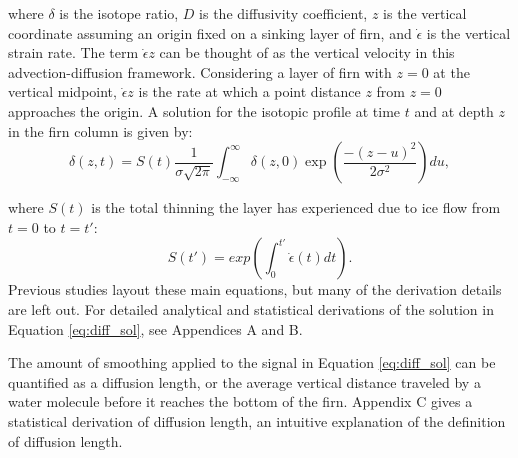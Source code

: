 \documentclass[draft, jgrga]{AGUTeX}
\begin{document}
\begin{article}
\noindent where \begin{math} \delta \end{math} is the isotope ratio, \begin{math} D \end{math} is the diffusivity coefficient, \begin{math} z \end{math} is the vertical coordinate assuming an origin fixed on a sinking layer of firn, and \begin{math} \dot{\epsilon} \end{math} is the vertical strain rate. The term \begin{math} \dot{\epsilon} z \end{math} can be thought of as the vertical velocity in this advection-diffusion framework. Considering a layer of firn with \begin{math} z = 0 \end{math} at the vertical midpoint, \begin{math} \dot{\epsilon} z \end{math} is the rate at which a point distance \begin{math} z \end{math} from \begin{math} z=0 \end{math} approaches the origin. A solution for the isotopic profile at time $t$ and at depth $z$ in the firn column is given by:
\begin{equation}
\label{eq:diff_sol}
\delta (z,t) = S(t) \frac{1}{\sigma \sqrt{2 \pi}}
\int^\infty_{-\infty} \delta (z,0) \exp \left(\frac{-(z-u)^2}{2 \sigma ^2} \right)du,
\end{equation}

\noindent where \begin{math} S(t) \end{math} is the total thinning the layer has experienced due to ice flow from $t=0$ to $t=t'$:
\begin{equation}
S(t') = exp \left( \int^{t'}_{0} \dot{\epsilon}(t) dt \right).
\end{equation}
Previous studies layout these main equations, but many of the derivation details are left out. For detailed analytical and statistical derivations of the solution in Equation \ref{eq:diff_sol}, see Appendices A and B.

The amount of smoothing applied to the signal in Equation \ref{eq:diff_sol} can be quantified as a diffusion length, or the average vertical distance traveled by a water molecule before it reaches the bottom of the firn. Appendix C gives a statistical derivation of diffusion length, an intuitive explanation of the definition of diffusion length.


\end{article}
\end{document}
